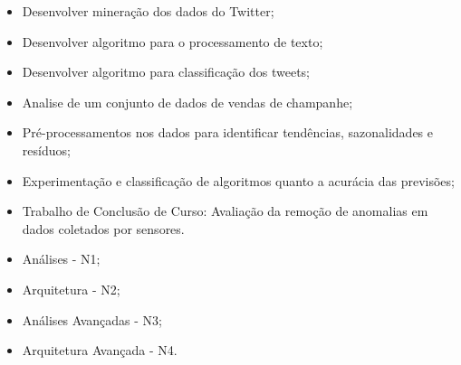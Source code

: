 \documentclass[10pt,a4paper,ragged2e]{altacv}
\begin{document}
\vspace{10px}



\begin{itemize}
    \item Desenvolver mineração dos dados do Twitter;
    \item Desenvolver algoritmo para o processamento de texto;
    \item Desenvolver algoritmo para classificação dos tweets;
\end{itemize}

\vspace{10px}

\begin{itemize}
    \item Analise de um conjunto de dados de vendas de champanhe;
    \item Pré-processamentos nos dados para identificar tendências, sazonalidades e resíduos;
    \item Experimentação e classificação de algoritmos quanto a acurácia das previsões;
\end{itemize}

\vspace{10px}



\begin{itemize}
    \item Trabalho de Conclusão de Curso: Avaliação da remoção de anomalias em dados coletados por sensores.
\end{itemize}

\vspace{10px}
\begin{itemize}
    \item Análises - N1;
    \item Arquitetura - N2;
    \item Análises Avançadas - N3;
    \item Arquitetura Avançada - N4.
\end{itemize}

\clearpage
\end{document}
